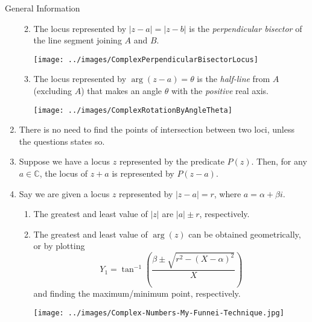 \documentclass[oneside]{book}
\begin{document}
\begin{stbox}{General Information}
\begin{enumerate}
\begin{enumerate}
\begin{enumerate}
\begin{center}
        \end{center}
      \end{enumerate}
      \item The locus represented by \(\lvert z-a \rvert =\lvert z-b \rvert\) is the \emph{perpendicular bisector} of the line segment joining \(A\) and \(B\).
      \begin{center}
        \texttt{[image: ../images/ComplexPerpendicularBisectorLocus]}
      \end{center}
      \item The locus represented by \(\arg(z-a)=\theta\) is the \emph{half-line} from \(A\) (excluding \(A\)) that makes an angle \(\theta\) with the \emph{positive} real axis.
      \begin{center}
        \texttt{[image: ../images/ComplexRotationByAngleTheta]}
      \end{center}
    \end{enumerate}
    \item There is no need to find the points of intersection between two loci, unless the questions states so. 
    \item Suppose we have a locus \(z\) represented by the predicate \(P(z)\). Then, for any \(a\in \mathbb{C}\), the locus of \(z+a\) is represented by \(P(z-a)\).
    \item Say we are given a locus \(z\) represented by \(\lvert z-a \rvert=r\), where \(a=\alpha+\beta i\). 
    \begin{enumerate}
      \item The greatest and least value of \(\lvert z \rvert\) are \(\lvert a \rvert \pm r\), respectively. 
      \item The greatest and least value of \(\arg(z)\) can be obtained geometrically, or by plotting 
      \[Y_1=\tan^{-1}\left(\frac{\beta\pm\sqrt{r^2-(X-\alpha)^2}}{X}\right)\]
      and finding the maximum/minimum point, respectively.
      \begin{center}
        \texttt{[image: ../images/Complex-Numbers-My-Funnei-Technique.jpg]}
      \end{center}
    \end{enumerate}
  \end{enumerate}
\end{stbox}
\end{document}
